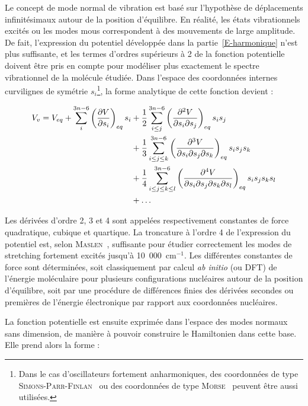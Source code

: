 \documentclass[12pt,a4paper]{book}
\begin{document}
Le concept de mode normal de vibration est basé sur l'hypothèse de déplacements infinitésimaux autour de la position d'équilibre. En réalité, les états vibrationnels excités ou les modes mous correspondent à des mouvements de large amplitude. De fait, l'expression du potentiel développée dans la partie~\ref{E-harmonique} n'est plus suffisante, et les termes d'ordres supérieurs à 2 de la fonction potentielle doivent être pris en compte pour modéliser plus exactement le spectre vibrationnel de la molécule étudiée. Dans l'espace des coordonnées internes curvilignes de symétrie $s_i$\footnote{Dans le cas d'oscillateurs fortement anharmoniques, des coordonnées de type \textsc{Simons-Parr-Finlan}~\cite{simons1973new} ou des coordonnées de type \textsc{Morse}~\cite{meyer1986abinitio} peuvent être aussi utilisées.}, la forme analytique de cette fonction devient :

\begin{align} \label{V-Taylor-si}
V_v = V_{eq} + \sum^{3n-6}_i\left(\frac{\partial V}{\partial s_i}\right)_{eq} s_i &+ \frac{1}{2} \sum^{3n-6}_{i\leq j} \left(\frac{\partial^2 V}{\partial s_i \partial s_j}\right)_{eq} s_i s_j \\ \notag
&+ \frac{1}{3} \sum^{3n-6}_{i\leq j\leq k} \left(\frac{\partial^3 V}{\partial s_i \partial s_j \partial s_k}\right)_{eq} s_i s_j s_k \\ \notag
&+ \frac{1}{4} \sum^{3n-6}_{i\leq j\leq k\leq l} \left(\frac{\partial^4 V}{\partial s_i \partial s_j \partial s_k \partial s_l}\right)_{eq} s_i s_j s_k s_l \\ \notag
&+ \ldots
\end{align}

Les dérivées d'ordre 2, 3 et 4 sont appelées respectivement constantes de force quadratique, cubique et quartique. 
La troncature à l'ordre 4 de l'expression du potentiel est, selon \textsc{Maslen}~\cite{maslen1991higher}, suffisante pour étudier correctement les modes de stretching fortement excités jusqu'à 10~000~cm$^{-1}$.
Les différentes constantes de force sont déterminées, soit classiquement par calcul \textit{ab initio} (ou DFT) de l'énergie moléculaire pour plusieurs configurations nucléaires autour de la position d'équilibre, soit par une procédure de différences finies des dérivées secondes ou premières de l'énergie électronique par rapport aux coordonnées nucléaires.

La fonction potentielle est ensuite exprimée dans l'espace des modes normaux sans dimension, de manière à pouvoir construire le Hamiltonien dans cette base. Elle prend alors la forme :
\end{document}

